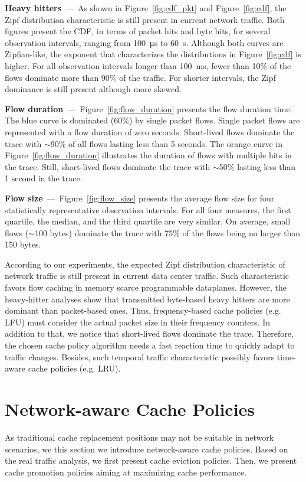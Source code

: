 \textbf{Heavy hitters}~---~As shown in Figure~\ref{fig:cdf_pkt} and Figure~\ref{fig:cdf}, the Zipf distribution characteristic is still present in current network traffic.
Both figures present the CDF, in terms of packet hits and byte hits, for several observation intervals, ranging from \SI{100}{\micro\second} to \SI{60}{\second}.
Although both curves are Zipfian-like, the exponent that characterizes the distributions in Figure~\ref{fig:cdf} is higher.
For all observation intervals longer than \SI{100}{\milli\second}, fewer than 10\% of the flows dominate more than 90\% of the traffic.
For shorter intervals, the Zipf dominance is still present although more skewed.

\textbf{Flow duration}~---~Figure~\ref{fig:flow_duration} presents the flow duration time.
The blue curve is dominated (60\%) by single packet flows.
Single packet flows are represented with a flow duration of zero seconds.
Short-lived flows dominate the trace with $\sim$90\% of all flows lasting less than 5 seconds.
The orange curve in Figure~\ref{fig:flow_duration} illustrates the duration of flows with multiple hits in the trace.
Still, short-lived flows dominate the trace with $\sim$50\% lasting less than 1 second in the trace.

\textbf{Flow size}~---~Figure~\ref{fig:flow_size} presents the average flow size for four statistically representative observation intervals.
For all four measures, the first quartile, the median, and the third quartile are very similar.
On average, small flows ($\sim$100 bytes) dominate the trace with 75\% of the flows being no larger than 150 bytes.

According to our experiments, the expected Zipf distribution characteristic of network traffic is still present in current data center traffic.
Such characteristic favors flow caching in memory scarce programmable dataplanes.
However, the heavy-hitter analyses show that transmitted byte-based heavy hitters are more dominant than packet-based ones.
Thus, frequency-based cache policies (e.g. LFU) must consider the actual packet size in their frequency counters.
In addition to that, we notice that short-lived flows dominate the trace.
Therefore, the chosen cache policy algorithm needs a fast reaction time to quickly adapt to traffic changes.
Besides, such temporal traffic characteristic possibly favors time-aware cache policies (e.g. LRU).

\section{Network-aware Cache Policies}\label{sec:policies}
As traditional cache replacement positions may not be suitable in network scenarios, we this section we introduce network-aware cache policies.
Based on the real traffic analysis, we first present cache eviction policies.
Then, we present cache promotion policies aiming at maximizing cache performance.

